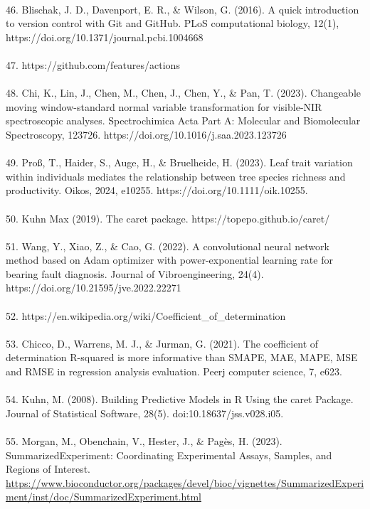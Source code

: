 \documentclass[12pt,a4paper]{report}
\begin{document}
\\
46. Blischak, J. D., Davenport, E. R., \& Wilson, G. (2016). A quick introduction to version control with Git and GitHub. PLoS computational biology, 12(1), https://doi.org/10.1371/journal.pcbi.1004668\\
\\
47. https://github.com/features/actions \\
\\
48. Chi, K., Lin, J., Chen, M., Chen, J., Chen, Y., \& Pan, T. (2023). Changeable moving window-standard normal variable transformation for visible-NIR spectroscopic analyses. Spectrochimica Acta Part A: Molecular and Biomolecular Spectroscopy, 123726. https://doi.org/10.1016/j.saa.2023.123726 \\
\\
49. Proß, T., Haider, S., Auge, H., \& Bruelheide, H. (2023). Leaf trait variation within individuals mediates the relationship between tree species richness and productivity. Oikos, 2024, e10255. https://doi.org/10.1111/oik.10255. \\
\\
50. Kuhn Max (2019). The caret package. https://topepo.github.io/caret/  \\
\\
51. Wang, Y., Xiao, Z., \& Cao, G. (2022). A convolutional neural network method based on Adam optimizer with power-exponential learning rate for bearing fault diagnosis. Journal of Vibroengineering, 24(4). https://doi.org/10.21595/jve.2022.22271 \\
\\
52. https://en.wikipedia.org/wiki/Coefficient\_of\_determination \\
\\
53. Chicco, D., Warrens, M. J., \& Jurman, G. (2021). The coefficient of determination R-squared is more informative than SMAPE, MAE, MAPE, MSE and RMSE in regression analysis evaluation. Peerj computer science, 7, e623. \\
\\
54. Kuhn, M. (2008). Building Predictive Models in R Using the caret Package. Journal of Statistical Software, 28(5). doi:10.18637/jss.v028.i05. \\
\\
55. Morgan, M., Obenchain, V., Hester, J., \& Pagès, H. (2023). SummarizedExperiment: Coordinating Experimental Assays, Samples, and Regions of Interest. \url{https://www.bioconductor.org/packages/devel/bioc/vignettes/SummarizedExperiment/inst/doc/SummarizedExperiment.html}
\end{document}

